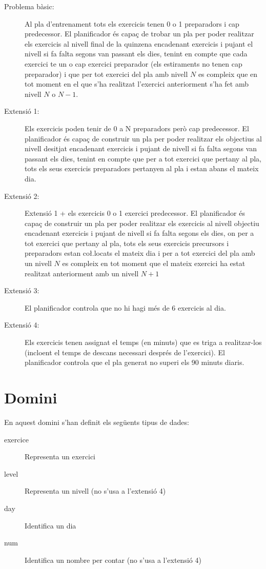 \documentclass[a4paper,12pt, UTF-8]{article}
\begin{document}
\begin{description}
	\item[Problema bàsic:] Al pla d'entrenament tots els exercicis tenen 0 o 1 preparadors i cap predecessor. El planificador és capaç de trobar un pla per poder realitzar els exercicis al nivell final de la quinzena encadenant exercicis i pujant el nivell si fa falta segons van passant els dies, tenint en compte que cada exercici te un o cap exercici preparador (els estiraments no tenen cap preparador) i que per tot exercici del pla amb nivell $N$ es compleix que en tot moment en el que s'ha realitzat l'exercici anteriorment s'ha fet amb nivell $N$ o $N - 1$.
	\item[Extensió 1:] Els exercicis poden tenir de 0 a N preparadors però cap predecessor. El planificador és capaç de construir un pla per poder realitzar els objectius al nivell desitjat encadenant exercicis i pujant de nivell si fa falta segons van passant els dies, tenint en compte que per a tot exercici que pertany al pla, tots els seus exercicis preparadors pertanyen al pla i estan abans el mateix dia.
	\item[Extensió 2:] Extensió 1 + 	els exercicis 0 o 1 exercici predecessor. El planificador és capaç de construir un pla per poder realitzar els exercicis al nivell objectiu encadenant exercicis i pujant de nivell si fa falta segons els dies, on per a tot exercici que pertany al pla, tots els seus exercicis precursors i preparadors estan co\l.locats el mateix dia i per a tot exercici del pla amb un nivell $N$ es compleix en tot moment que el mateix exercici ha estat realitzat anteriorment amb un nivell $N + 1$
	\item[Extensió 3:] El planificador controla que no hi hagi més de 6 exercicis al dia.
	\item[Extensió 4:] Els exercicis tenen assignat el temps (en minuts) que es triga a realitzar-los (incloent el temps de descans necessari després de l'exercici). El planificador controla que el pla generat no superi els 90 minuts diaris. 
\end{description}

\section{Domini}

En aquest domini s'han definit els següents tipus de dades:

\begin{description}
	\item[exercice] Representa un exercici
	\item[level] Representa un nivell (no s'usa a l'extensió 4)
	\item[day] Identifica un dia
	\item[num] Identifica un nombre per contar (no s'usa a l'extensió 4)
\end{description}
\end{document}
